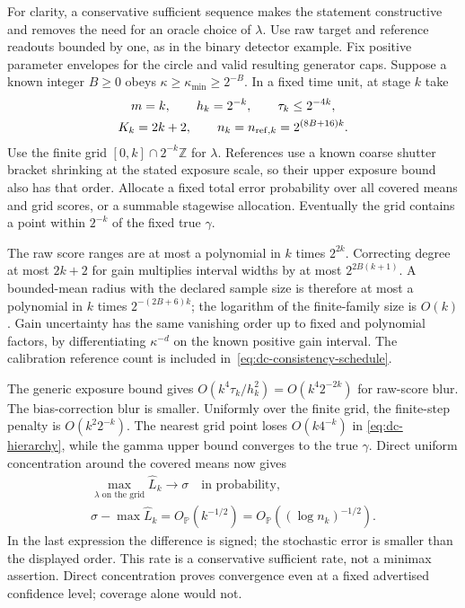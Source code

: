For clarity, a conservative sufficient sequence makes the statement
constructive and removes the need for an oracle choice of $\lambda$.  Use
raw target and reference readouts bounded by one, as in the binary detector
example.  Fix positive parameter envelopes for the circle and valid resulting generator
caps.  Suppose a known integer $B\ge0$ obeys
$\kappa\ge\kappa_{\min}\ge2^{-B}$.  In a fixed time unit, at stage $k$ take
\begin{equation}
 \begin{gathered}
 m=k,\qquad h_k=2^{-k},\qquad \tau_k\le2^{-4k},\\
 K_k=2k+2,\qquad n_k=n_{{\rm ref},k}=2^{(8B+16)k}.
 \end{gathered}
 \label{eq:dc-consistency-schedule}
\end{equation}
Use the finite grid $[0,k]\cap2^{-k}\mathbb Z$ for $\lambda$.  References
use a known coarse shutter bracket shrinking at the stated exposure scale,
so their upper exposure bound also has that order.  Allocate a fixed total
error probability over all covered means and grid scores, or a summable
stagewise allocation.  Eventually the grid contains a point within $2^{-k}$
of the fixed true $\gamma$.

The raw score ranges are at most a polynomial in $k$ times $2^{2k}$.
Correcting degree at most $2k+2$ for gain multiplies interval widths by at
most $2^{2B(k+1)}$.  A bounded-mean radius with the declared sample size is
therefore at most a polynomial in $k$ times $2^{-(2B+6)k}$; the logarithm
of the finite-family size is $O(k)$.  Gain uncertainty has the same
vanishing order up to fixed and polynomial factors, by differentiating
$\kappa^{-d}$ on the known positive gain interval.  The calibration
reference count is included in~\eqref{eq:dc-consistency-schedule}.

The generic exposure bound gives
$O(k^4\tau_k/h_k^2)=O(k^4 2^{-2k})$ for raw-score blur.  The bias-correction
blur is smaller.  Uniformly over the finite grid, the finite-step penalty
is $O(k^2 2^{-k})$.  The nearest grid point loses $O(k4^{-k})$ in
\eqref{eq:dc-hierarchy}, while the gamma upper bound converges to the true
$\gamma$.  Direct uniform concentration around the covered means now gives
\begin{equation}
 \begin{gathered}
 \max_{\lambda\text{ on the grid}}\widehat L_k
       \longrightarrow\sigma\quad\text{in probability},\\
 \sigma-\max\widehat L_k
       =O_{\mathbb P}(k^{-1/2})
       =O_{\mathbb P}((\log n_k)^{-1/2}).
 \end{gathered}
 \label{eq:dc-consistency}
\end{equation}
In the last expression the difference is signed; the stochastic error is
smaller than the displayed order.  This rate is a conservative sufficient
rate, not a minimax assertion.  Direct concentration proves convergence
even at a fixed advertised confidence level; coverage alone would not.

